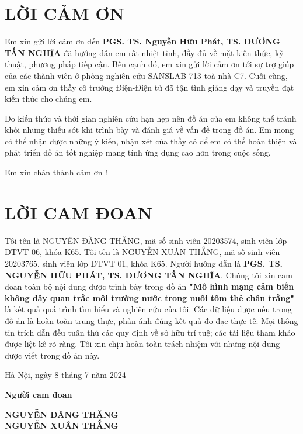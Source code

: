 \section*{LỜI CẢM ƠN}
Em xin gửi lời cảm ơn đến \textbf{ PGS. TS. Nguyễn Hữu Phát, TS. DƯƠNG TẤN NGHĨA} đã hướng dẫn em rất nhiệt tình, đầy đủ về mặt kiến thức, kỹ thuật, phương pháp tiếp cận. Bên cạnh đó, em xin gửi lời cảm ơn tới sự trợ giúp của các thành viên ở phòng nghiên cứu SANSLAB 713 toà nhà C7. Cuối cùng, em xin cảm ơn thầy cô trường Điện-Điện tử đã tận tình giảng dạy và truyền đạt kiến thức cho chúng em. 

Do kiến thức và thời gian nghiên cứu hạn hẹp nên đồ án của em không thể tránh khỏi những thiếu sót khi trình bày và đánh giá về vấn đề trong đồ án. Em mong có thể nhận được những ý kiến, nhận xét của thầy cô để em có thể hoàn thiện và phát triển đồ án tốt nghiệp mang tính ứng dụng cao hơn trong cuộc sống. 

\vspace{10pt}
\hspace{8.7cm}Em xin chân thành cảm ơn !
\thispagestyle{empty}
\clearpage


\section*{LỜI CAM ĐOAN}
\thispagestyle{empty}
Tôi tên là NGUYÊN ĐĂNG THĂNG, mã số sinh viên 20203574, sinh viên lớp ĐTVT 06, khóa K65. Tôi tên là NGUYỄN XUÂN THẮNG, mã số sinh viên 20203765, sinh viên lớp DTVT 01, khóa K65. Người hướng dẫn là \textbf{PGS. TS. NGUYỄN HỮU PHÁT, TS. DƯƠNG TẤN NGHĨA}. Chúng tôi xin cam đoan toàn bộ nội dung được trình bày trong đồ án \textbf{"Mô hình mạng cảm biến không dây quan trắc môi trường nước trong nuôi tôm thẻ chân trắng"} là kết quả quá trình tìm hiểu và nghiên cứu của tôi. Các dữ liệu được nêu trong đồ án là hoàn toàn trung thực, phản ánh đúng kết quả đo đạc thực tế. Mọi thông tin trích dẫn đều tuân thủ các quy định về sở hữu trí tuệ; các tài liệu tham khảo được liệt kê rõ ràng. Tôi xin chịu hoàn toàn trách nhiệm với những nội dung được viết trong đồ án này.

\vspace{6pt}
\hspace{7cm}Hà Nội, ngày 8 tháng 7 năm 2024

\hspace{9cm}\textbf{Người cam đoan}

\vspace{1.5cm}
\hspace{8cm}\textbf{NGUYỄN ĐĂNG THĂNG}\\
\vspace{1cm}
\hspace{8.87cm}\textbf{NGUYỄN XUÂN THẮNG}

